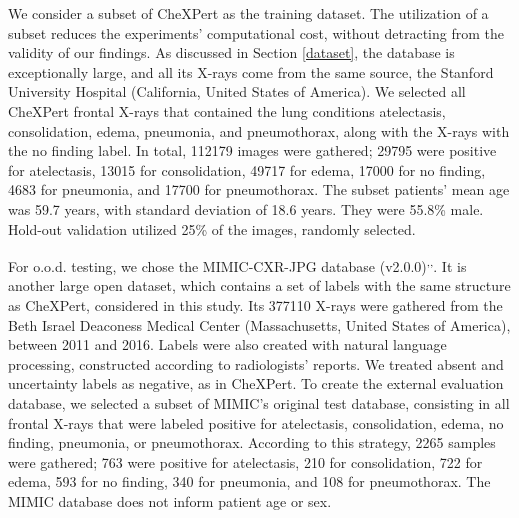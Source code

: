 \documentclass[fleqn,10pt]{wlscirep}
\begin{document}
{We consider a subset of CheXPert\cite{irvin2019chexpert} as the training dataset. The utilization of a subset reduces the experiments' computational cost, without detracting from the validity of our findings. As discussed in Section \ref{dataset}, the database is exceptionally large, and all its X-rays come from the same source, the Stanford University Hospital (California, United States of America). We selected all CheXPert frontal X-rays that contained the lung conditions atelectasis, consolidation, edema, pneumonia, and pneumothorax, along with the X-rays with the no finding label. In total, 112179 images were gathered; 29795 were positive for atelectasis, 13015 for consolidation, 49717 for edema, 17000 for no finding, 4683 for pneumonia, and 17700 for pneumothorax. The subset patients' mean age was 59.7 years, with standard deviation of 18.6 years. They were 55.8\% male. Hold-out validation utilized 25\% of the images, randomly selected.

For o.o.d. testing, we chose the MIMIC-CXR-JPG database (v2.0.0)\cite{MIMIC}\textsuperscript{,}\cite{MIMIC1}\textsuperscript{,}\cite{PhysioNet}. It is another large open dataset, which contains a set of labels with the same structure as CheXPert, considered in this study. Its 377110 X-rays were gathered from the Beth Israel Deaconess Medical Center (Massachusetts, United States of America), between 2011 and 2016. Labels were also created with natural language processing, constructed according to radiologists' reports. We treated absent and uncertainty labels as negative, as in CheXPert. To create the external evaluation database, we selected a subset of MIMIC's original test database, consisting in all frontal X-rays that were labeled positive for atelectasis, consolidation, edema, no finding, pneumonia, or pneumothorax. According to this strategy, 2265 samples were gathered; 763 were positive for atelectasis, 210 for consolidation, 722 for edema, 593 for no finding, 340 for pneumonia, and 108 for pneumothorax. The MIMIC database does not inform patient age or sex.

}
\end{document}
